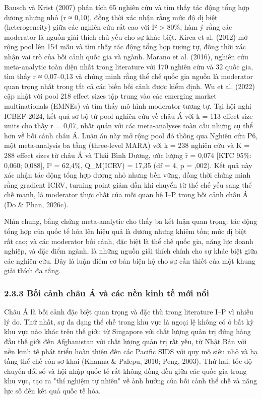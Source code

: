 \documentclass[12pt,a4paper]{article}
\begin{document}
Bausch và Krist (2007) phân tích 65 nghiên cứu và tìm thấy tác động tổng
hợp dương nhưng nhỏ (r ≈ 0,10), đồng thời xác nhận rằng mức độ dị biệt
(heterogeneity) giữa các nghiên cứu rất cao với I² \textgreater{} 80\%,
hàm ý rằng các moderator là nguồn giải thích chủ yếu cho sự khác biệt.
Kirca et al. (2012) mở rộng pool lên 154 mẫu và tìm thấy tác động tổng
hợp tương tự, đồng thời xác nhận vai trò của bối cảnh quốc gia và ngành.
Marano et al. (2016), nghiên cứu meta-analytic toàn diện nhất trong
literature với 170 nghiên cứu và 32 quốc gia, tìm thấy r ≈ 0,07--0,13 và
chứng minh rằng thể chế quốc gia nguồn là moderator quan trọng nhất
trong tất cả các biến bối cảnh được kiểm định. Wu et al. (2022) cập nhật
với pool 218 effect sizes tập trung vào các emerging market
multinationals (EMNEs) và tìm thấy mô hình moderator tương tự. Tại hội
nghị ICBEF 2024, kết quả sơ bộ từ pool nghiên cứu về châu Á với k = 113
effect-size units cho thấy r = 0,07, nhất quán với các meta-analyses
toàn cầu nhưng cụ thể hơn về bối cảnh châu Á. Luận án này mở rộng pool
đó thông qua Nghiên cứu P6, một meta-analysis ba tầng (three-level MARA)
với k = 238 nghiên cứu và K = 288 effect sizes từ châu Á và Thái Bình
Dương, ước lượng r̄ = 0,074 {[}KTC 95\%: 0,060; 0,088{]}, I² = 62,4\%,
Q\_M(ICRV) = 17,35 (df = 4, p = ,002). Kết quả này xác nhận tác động
tổng hợp dương nhỏ nhưng bền vững, đồng thời chứng minh rằng gradient
ICRV, turning point giảm dần khi chuyển từ thể chế yếu sang thể chế
mạnh, là moderator thực chất của mối quan hệ I--P trong bối cảnh châu Á
(Do \& Phan, 2026c).

Nhìn chung, bằng chứng meta-analytic cho thấy ba kết luận quan trọng:
tác động tổng hợp của quốc tế hóa lên hiệu quả là dương nhưng khiêm tốn;
mức dị biệt rất cao; và các moderator bối cảnh, đặc biệt là thể chế quốc
gia, năng lực doanh nghiệp, và đặc điểm ngành, là những nguồn giải thích
chính cho sự khác biệt giữa các nghiên cứu. Đây là luận điểm cơ bản biện
hộ cho sự cần thiết của một khung giải thích đa tầng.

\hypertarget{233-bux1ed1i-cux1ea3nh-chuxe2u-uxe1-vuxe0-cuxe1c-nux1ec1n-kinh-tux1ebf-mux1edbi-nux1ed5i}{%
\subsubsection{2.3.3 Bối cảnh châu Á và các nền kinh tế mới
nổi}\label{233-bux1ed1i-cux1ea3nh-chuxe2u-uxe1-vuxe0-cuxe1c-nux1ec1n-kinh-tux1ebf-mux1edbi-nux1ed5i}}

Châu Á là bối cảnh đặc biệt quan trọng và đặc thù trong literature I--P
vì nhiều lý do. Thứ nhất, sự đa dạng thể chế trong khu vực là ngoại lệ
không có ở bất kỳ khu vực nào khác trên thế giới: từ Singapore với chất
lượng quản trị đứng hàng đầu thế giới đến Afghanistan với chất lượng
quản trị rất yếu, từ Nhật Bản với nền kinh tế phát triển hoàn thiện đến
các Pacific SIDS với quy mô siêu nhỏ và hạ tầng thể chế còn sơ khai
(Khanna \& Palepu, 2010; Peng, 2003). Thứ hai, tốc độ chuyển đổi số và
hội nhập quốc tế rất không đồng đều giữa các quốc gia trong khu vực, tạo
ra "thí nghiệm tự nhiên" về ảnh hưởng của bối cảnh thể chế và năng lực
số đến kết quả quốc tế hóa.
\end{document}
